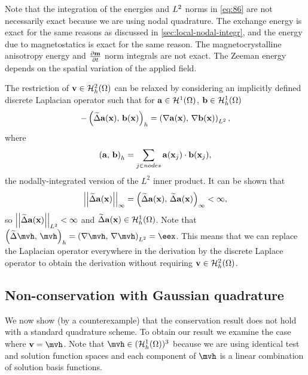 {Note that the integration of the energies and ${L^2}$ norms in \cref{eq:86} are not necessarily exact because we are using nodal quadrature.
The exchange energy is exact for the same reasons as discussed in \cref{sec:local-nodal-integr}, and the energy due to magnetostatics is exact for the same reason.
The magnetocrystalline anisotropy energy and $\frac{\partial \boldsymbol{\mathrm{m}}}{\partial t}$ norm integrals are not exact.
The Zeeman energy depends on the spatial variation of the applied field.

The restriction of $\boldsymbol{\mathrm{v}} \in \mathcal{H}_h^2(\Omega)$ can be relaxed by considering an implicitly defined discrete Laplacian operator such that for ${\boldsymbol{\mathrm{a}}} \in \mathcal{H}^1(\Omega)$, ${\boldsymbol{\mathrm{b}}} \in {\mathcal{H}^1_h(\Omega)}$
\begin{equation}
  -\left(\widetilde{\Delta} {\boldsymbol{\mathrm{a}}}(\boldsymbol{\mathrm{x}}),\, {\boldsymbol{\mathrm{b}}}(\boldsymbol{\mathrm{x}}) \right)_h = \left(\nabla {\boldsymbol{\mathrm{a}}}(\boldsymbol{\mathrm{x}}),\, \nabla {\boldsymbol{\mathrm{b}}}(\boldsymbol{\mathrm{x}}) \right)_{{L^2}},
\end{equation}
where
\begin{equation}
  \left({\boldsymbol{\mathrm{a}}},\, {\boldsymbol{\mathrm{b}}} \right)_h = \sum_{j \in nodes} {\boldsymbol{\mathrm{a}}}(\boldsymbol{\mathrm{x}}_j) \cdot {\boldsymbol{\mathrm{b}}}(\boldsymbol{\mathrm{x}}_j),
\end{equation}
\ie the nodally-integrated version of the $L^2$ inner product.
It can be shown \cite{Bartels2007} that
\begin{equation}
  \left| \left| \widetilde{\Delta} {\boldsymbol{\mathrm{a}}}(\boldsymbol{\mathrm{x}}) \right| \right|_{\infty} = \left(\widetilde{\Delta} {\boldsymbol{\mathrm{a}}}(\boldsymbol{\mathrm{x}}),\, \widetilde{\Delta} {\boldsymbol{\mathrm{a}}}(\boldsymbol{\mathrm{x}}) \right)_\infty < \infty,
\end{equation}
so $\left| \left| \widetilde{\Delta} {\boldsymbol{\mathrm{a}}}(\boldsymbol{\mathrm{x}}) \right| \right|_{{L^2}} < \infty$ and $\widetilde{\Delta} {\boldsymbol{\mathrm{a}}}(\boldsymbol{\mathrm{x}}) \in {\mathcal{H}^1_h(\Omega)}$.
Note that $\ip{\disclap \mvh}{\mvh}_h = \ltip{\grad \mvh}{\grad \mvh} = \eex$.
This means that we can replace the Laplacian operator everywhere in the derivation by the discrete Laplace operator to obtain the derivation without requiring $\boldsymbol{\mathrm{v}} \in \mathcal{H}_h^2(\Omega)$.

\subsection{Non-conservation with Gaussian quadrature}
\label{sec:non-cons-gaussian}

We now show (by a counterexample) that the conservation result does not hold with a standard quadrature scheme.
To obtain our result we examine the case where $\testv = \mvh$.
Note that $\mvh \in (\ts)^3$ because we are using identical test and solution function spaces and each component of $\mvh$ is a linear combination of solution basis functions.

}
